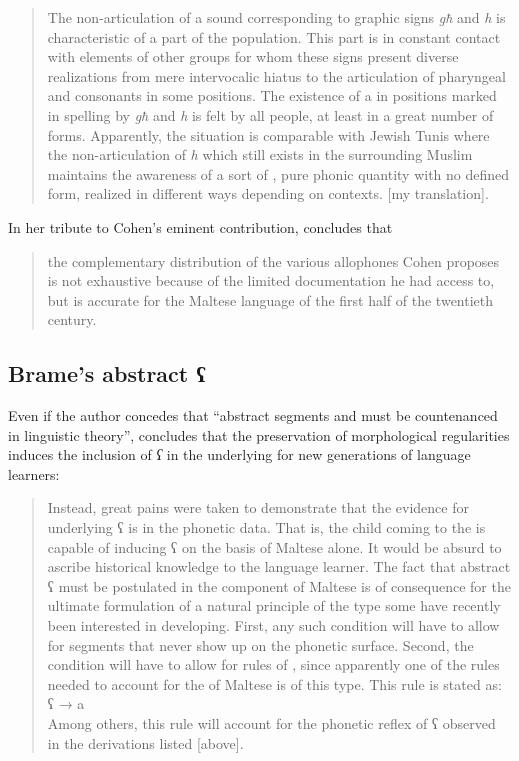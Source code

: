 \documentclass[output=paper]{langsci/langscibook}
\begin{document}
\begin{quote}
The non-articulation of a sound corresponding to graphic signs \textit{għ} and \textit{h} is characteristic of a part of the population. This part is in constant contact with elements of other groups for whom these signs present diverse realizations from mere intervocalic hiatus to the articulation of pharyngeal and  consonants in some positions. The existence of a  in positions marked in spelling by \textit{għ} and \textit{h} is felt by all people, at least in a great number of forms. Apparently, the situation is comparable with Jewish Tunis where the non-articulation of  \textit{h} which still exists in the surrounding Muslim  maintains the awareness of a sort of , pure phonic quantity with no defined form, realized in different ways depending on contexts. [my translation].
\end{quote}

In her tribute to Cohen's eminent contribution, \citet[6]{Vanhove2016} concludes that

\begin{quote}
the complementary distribution of the various allophones Cohen proposes is not exhaustive because of the limited documentation he had access to, but is accurate for the Maltese language of the first half of the twentieth century.
\end{quote}


\subsection{Brame's abstract ʕ}
Even if the author concedes that “abstract segments and  must be countenanced in linguistic theory”, \citet[60]{Brame1972} concludes that the preservation of morphological regularities induces the inclusion of \textit{ʕ} in the underlying  for new generations of language learners:

\begin{quote}
Instead, great pains were taken to demonstrate that the evidence for underlying ʕ is in the phonetic data. That is, the child coming to the  is capable of inducing ʕ on the basis of Maltese  alone. It would be absurd to ascribe historical knowledge to the language learner. The fact that abstract ʕ must be postulated in the  component of Maltese is of consequence for the ultimate formulation of a natural principle of the type some have recently been interested in developing. First, any such condition will have to allow for  segments that never show up on the phonetic surface. Second, the condition will have to allow for rules of , since apparently one of the rules needed to account for the  of Maltese is of this type. This rule is stated as:
\\
  ʕ → a
\\
Among others, this rule will account for the phonetic reflex of ʕ observed in the derivations listed [above].
\end{quote}
\end{document}

